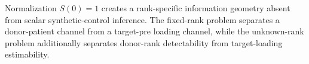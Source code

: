 Normalization \(S(0)=1\) creates a rank-specific information geometry absent from scalar synthetic-control inference.  The fixed-rank problem separates a donor-patient channel from a target-pre loading channel, while the unknown-rank problem additionally separates donor-rank detectability from target-loading estimability.